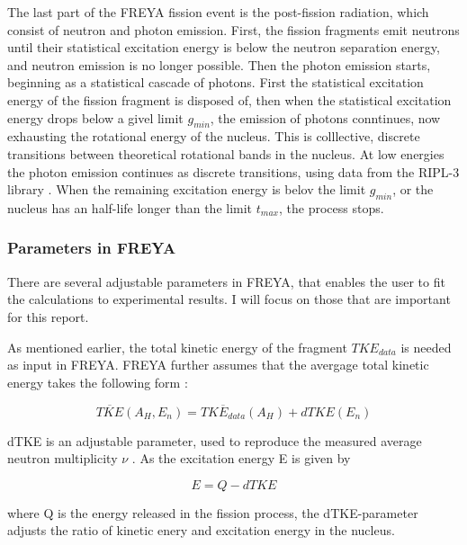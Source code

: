 \documentclass[]{article}
\begin{document}
The last part of the FREYA fission event is the post-fission radiation, which consist of neutron and photon emission. First, the fission fragments emit neutrons until their statistical excitation energy is below the neutron separation energy, and neutron emission is no longer possible. Then the photon emission starts, beginning as a statistical cascade of photons. First the statistical excitation energy of the fission fragment is disposed of, then when the statistical excitation energy drops below a givel limit $g_{min}$, the emission of photons conntinues, now exhausting the rotational energy of the nucleus. This is colllective, discrete transitions between theoretical rotational bands in the nucleus. At low energies the photon emission continues as discrete transitions, using data from the RIPL-3 library \cite{FREYAusemanual}. When the remaining excitation energy is belov the limit $g_{min}$, or the nucleus has an half-life longer than the limit $t_{max}$, the process stops. 

\subsubsection{Parameters in FREYA}
\label{Parameters_FREYA}
There are several adjustable parameters in FREYA, that enables the user to fit the calculations to experimental results. I will focus on those that are important for this report. 

As mentioned earlier, the total kinetic energy of the fragment $TKE_{data}$ is needed as input in FREYA. FREYA further assumes that the avergage total kinetic energy takes the following form \cite{FREYAusemanual}:

\begin{equation}
	\label{eq:total_kinetiv_energy}
	\overline{TKE}(A_H, E_n) = \overline{TKE_{data}}(A_H) + dTKE(E_n)
\end{equation}

dTKE is an adjustable parameter, used to reproduce the measured average neutron multiplicity $\nu$ \cite{FREYAusemanual}. As the excitation energy E is given by

\begin{equation}
	E = Q - dTKE
\end{equation}

 where Q is the energy released in the fission process, the dTKE-parameter adjusts the ratio of kinetic enery and excitation energy in the nucleus. \par 
\vspace{3mm}
\end{document}
